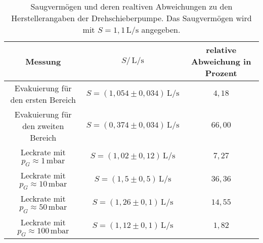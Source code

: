 \begin{table}
    \centering
    \caption{Saugvermögen und deren realtiven Abweichungen zu den Herstellerangaben der Drehschieberpumpe. Das
    Saugvermögen wird mit $S=1,1\,\si{\liter\per\second}$ angegeben.}
    \label{tab:S2}
    \begin{tabular}{c c c}
        \toprule
        Messung & $S/\,\si{\liter\per\second}$ & relative Abweichung in Prozent \\
        \midrule
        Evakuierung für den ersten Bereich & $S = (1,054 \pm 0,034)\,\si{\liter\per\second}$ & $4,18$ \\
        Evakuierung für den zweiten Bereich & $S = (0,374 \pm 0,034)\,\si{\liter\per\second}$ & $66,00$ \\
        Leckrate mit $p_G \approx 1 \,\si{\milli\bar}$ & $S = (1,02 \pm 0,12)\,\si{\liter\per\second}$ & $7,27$\\
        Leckrate mit $p_G \approx 10 \,\si{\milli\bar}$ & $S = (1,5 \pm 0,5)\,\si{\liter\per\second}$ & $36,36$\\
        Leckrate mit $p_G \approx 50 \,\si{\milli\bar}$ & $S = (1,26 \pm 0,1)\,\si{\liter\per\second}$ & $14,55$\\
        Leckrate mit $p_G \approx 100 \,\si{\milli\bar}$ & $S = (1,12 \pm 0,1)\,\si{\liter\per\second}$ & $1,82$\\
        \bottomrule
    \end{tabular}
\end{table}